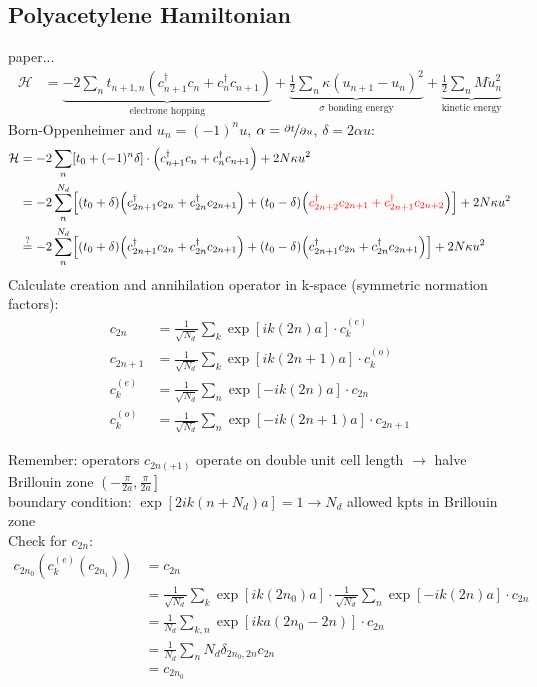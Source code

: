 \subsection{Polyacetylene Hamiltonian}
paper...
\begin{align}
	\mathcal{H} &= \underbrace{-2\sum_{n} t_{n+1,n}\left(c_{n+1}^\dagger c_n + c_n^\dagger c_{n+1}\right)}_{\text{electrone hopping}} +
	\underbrace{\frac{1}{2}\sum_n \kappa (u_{n+1} - u_n)^2}_{\sigma \text{ bonding energy}} + 
	\underbrace{\frac{1}{2} \sum_n M \dot{u}^2_n}_{\text{kinetic energy}}
\end{align}
Born-Oppenheimer and $u_n = (-1)^nu$, $\alpha = \nicefrac{\partial t}{\partial u}$, $\delta = 2\alpha u$:
\begin{align}
	\mathcal{H} &= -2\sum_n \left[t_0 + (-1)^n\delta\right]\cdot\left(c_{n+1}^\dagger c_n + c_n^\dagger c_{n+1}\right) + 2N\kappa u^2\\
	&= -2\sum_n^{N_d} \left[\left(t_0+\delta\right)\left(c_{2n+1}^\dagger c_{2n} + c_{2n}^\dagger c_{2n+1} \right) + 
	\left(t_0-\delta\right)\left(\textcolor{red}{c_{2n+2}^\dagger c_{2n+1} + c_{2n+1}^\dagger c_{2n+2}} \right)\right]+2N\kappa u^2\\
	&\stackrel{?}{=} -2\sum_n^{N_d} \left[\left(t_0+\delta\right)\left(c_{2n+1}^\dagger c_{2n} + c_{2n}^\dagger c_{2n+1} \right) + 
	\left(t_0-\delta\right)\left(c_{2n+1}^\dagger c_{2n} + c_{2n}^\dagger c_{2n+1} \right)\right]+2N\kappa u^2
\end{align}
Calculate creation and annihilation operator in k-space (symmetric normation factors):
\begin{align}
	c_{2n} &= \frac{1}{\sqrt{N_d}}\sum_k\exp\left[ik\left(2n\right)a\right]\cdot c_{k}^{(e)}\\
	c_{2n+1} &= \frac{1}{\sqrt{N_d}}\sum_k\exp\left[ik\left(2n+1\right)a\right]\cdot c_{k}^{(o)}\\
	c_k^{(e)} &= \frac{1}{\sqrt{N_d}}\sum_n \exp\left[-ik\left(2n\right)a\right]\cdot c_{2n}\\
	c_k^{(o)} &= \frac{1}{\sqrt{N_d}}\sum_n \exp\left[-ik\left(2n+1\right)a\right]\cdot c_{2n+1}
\end{align}

Remember: operators $c_{2n(+1)}$ operate on double unit cell length $\rightarrow$ halve Brillouin zone $\left(-\frac{\pi}{2a}, \frac{\pi}{2a}\right]$\\
boundary condition: $\exp\left[2ik\left(n+N_d\right)a\right] = 1 \rightarrow N_d$ allowed kpts in Brillouin zone\\
Check for $c_{2n}$:
\begin{align}
	c_{2n_0}(c_k^{(e)}(c_{2n_i})) &= c_{2n} \\
	&= \frac{1}{\sqrt{N_d}}\sum_k\exp\left[ik\left(2n_0\right)a\right]\cdot \frac{1}{\sqrt{N_d}}\sum_n \exp\left[-ik\left(2n\right)a\right]\cdot c_{2n}\\
	&= \frac{1}{N_d}\sum_{k, n} \exp\left[ika\left(2n_0-2n\right)\right]\cdot c_{2n}\\
	&= \frac{1}{N_d}\sum_n N_d \delta_{2n_0,2n} c_{2n}\\
	&= c_{2n_0}
\end{align}

